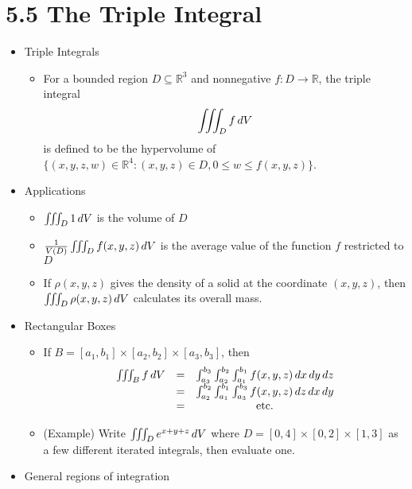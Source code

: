 \documentclass[11pt]{article}
\begin{document}
\section*{5.5 The Triple Integral}

\begin{itemize}
  \item Triple Integrals
    \begin{itemize}
      \item
      For a bounded region \(D\subseteq\mathbb R^3\) and nonnegative
      \(f:D\to\mathbb R\), the triple integral
        \[
          \iiint_D f\,d V
        \]
      is defined to be the hypervolume of
      \(\{(x,y,z,w)\in\mathbb R^4:(x,y,z)\in D,0\leq w\leq f(x,y,z)\}\).
    \end{itemize}
  \item Applications
    \begin{itemize}
      \item \(\iiint_D 1\,d V\) is the volume of \(D\)
      \item \(\frac{1}{V(D)}\iiint_D f(x,y,z)\,d V\) is the average value
            of the function \(f\) restricted to \(D\)
      \item If \(\rho(x,y,z)\) gives the density of a solid at the coordinate
            \((x,y,z)\), then \(\iiint_D \rho(x,y,z)\,d V\) calculates its
            overall mass.
    \end{itemize}
  \item Rectangular Boxes
    \begin{itemize}
      \item
      If \(B=[a_1,b_1]\times[a_2,b_2]\times[a_3,b_3]\), then
        \[
          \begin{matrix}
            \iiint_B f\,d V
              & = &
            \int_{a_3}^{b_3}\int_{a_2}^{b_2}\int_{a_1}^{b_1}
            f(x,y,z) \,d x\,d y\,d z
              \\ & = &
            \int_{a_2}^{b_2}\int_{a_1}^{b_1}\int_{a_3}^{b_3}
            f(x,y,z) \,d z\,d x\,d y
              \\ & = &
            \text{etc.}
          \end{matrix}
        \]
      \item
      (Example)
      Write \(\iiint_D e^{x+y+z}\,d V\) where
      \(D=[0,4]\times[0,2]\times[1,3]\) as a few different iterated integrals,
      then evaluate one.
    \end{itemize}
  \item General regions of integration

\end{itemize}
\end{document}
